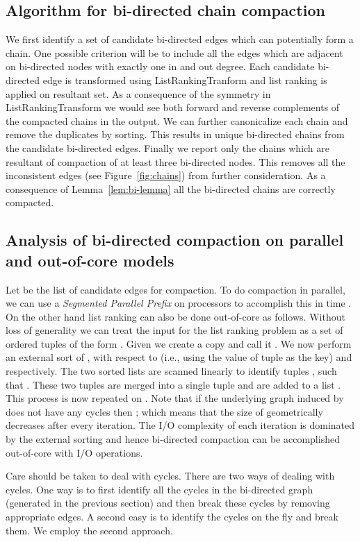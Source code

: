 \documentclass[11pt,conference,twocolumn]{IEEEtran}
\begin{document}
\subsection{Algorithm for bi-directed chain compaction}
We first identify a set of candidate bi-directed edges which can potentially form a chain. One possible
criterion will be to include all the edges which are adjacent on bi-directed nodes with exactly one in
and out degree. Each candidate bi-directed edge is transformed using {\sf ListRankingTranform} and 
{\sf list ranking} is applied on resultant set. As a consequence of the symmetry in {\sf ListRankingTransform}
we would see both forward and reverse complements of the compacted chains in the output. We can further
canonicalize each chain and remove the duplicates by sorting. This results in unique bi-directed chains
from the candidate bi-directed edges. Finally we report only the chains which are resultant of compaction
of at least three bi-directed nodes. This removes all the inconsistent edges (see Figure~\ref{fig:chains})
from further consideration. As a consequence of Lemma~\ref{lem:bi-lemma} all the bi-directed chains are
correctly compacted.
\subsection{Analysis of bi-directed compaction on parallel and out-of-core models}
Let  be the list of candidate edges for compaction. To do compaction in parallel, we can use 
a {\em Segmented Parallel Prefix} on  processors to accomplish this in time . 
On the other hand list ranking can also be done out-of-core as follows. Without loss of generality we can
treat the input for the list ranking problem as a set  of ordered tuples of the form . Given 
we create a copy and call it . We now perform an external sort of ,  with respect to  (i.e., using
the  value of tuple  as the key) and  respectively. The two sorted lists are scanned linearly to
identify tuples ,  such that . These two tuples are merged into a single
tuple  and are added to a list . This process is  now repeated on .
Note that if the underlying graph induced by  does not have any cycles then 
; which means that the size of  geometrically
decreases after every iteration. The I/O complexity of each iteration is dominated by the external sorting and hence bi-directed compaction can be accomplished out-of-core with  I/O operations.

Care should be taken to deal with cycles. There are two ways of dealing with cycles. One way is to first identify
all the cycles in the bi-directed graph (generated in the previous section) and then break these cycles by removing
appropriate edges. A second easy is to identify the cycles on the fly and break them. We employ the second
approach. 
\end{document}
